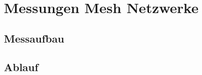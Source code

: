 \clearpage
\section{Messungen Mesh Netzwerke}\label{sec:MessungenMeshNetzwerke}

\subsection{Messaufbau}\label{sec:Messaufbau}

\subsection{Ablauf}\label{sec:Ablauf}



